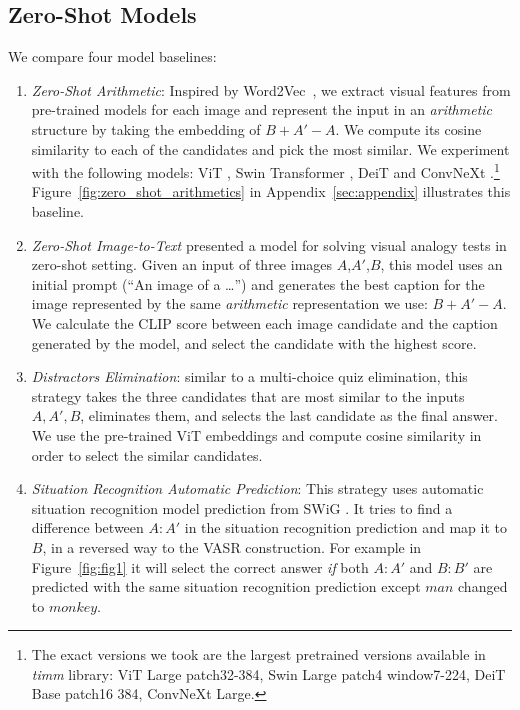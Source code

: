 \documentclass[letterpaper]{article} \usepackage{aaai23}  \usepackage{times}  \usepackage{helvet}  \usepackage{courier}  \usepackage[hyphens]{url}  \usepackage{graphicx} \urlstyle{rm} \def\UrlFont{\rm}  \usepackage{natbib}  \usepackage{caption} \frenchspacing  \setlength{\pdfpagewidth}{8.5in}  \setlength{\pdfpageheight}{11in}  \usepackage{algorithm}
\newcommand{\zeroshot}[0]{\emph{Zero-Shot Arithmetic}}
\begin{document}
\subsection{Zero-Shot Models} 
We compare four model baselines:
\begin{enumerate}
    \item \zeroshot{}: Inspired by Word2Vec~\cite{mikolov2013linguistic}, we extract visual features from pre-trained models for each image and represent the input in an \emph{arithmetic} structure by taking the embedding of $B+A'-A$. We compute its cosine similarity to each of the candidates and pick the most similar. We experiment with the following models: ViT \cite{dosovitskiy2020image}, Swin Transformer \cite{liu2021swin}, DeiT \cite{touvron2021training} and ConvNeXt \cite{liu2022convnet}.\footnote{The exact versions we took are the largest pretrained versions available in \emph{timm} library: ViT Large patch32-384, Swin Large patch4 window7-224, DeiT Base patch16 384, ConvNeXt Large.} Figure~\ref{fig:zero_shot_arithmetics} in Appendix~\ref{sec:appendix} illustrates this baseline.
    \item \emph{Zero-Shot Image-to-Text} \cite{tewel2021zero}  presented a model  for  solving visual analogy tests in zero-shot setting. Given an input of three images $A$,$A'$,$B$, this model uses an initial prompt (``An image of a \dots'') and generates the best caption for the image represented by the same \emph{arithmetic} representation we use: $B+A'-A$. We calculate the  CLIP score between each image candidate and the caption generated by the model, and select the candidate with the highest score.
    \item \emph{Distractors Elimination}: similar to a multi-choice quiz elimination, this strategy takes the three candidates that are most similar to the inputs $A, A', B$, eliminates them, and selects the last candidate as the final answer. We use the pre-trained ViT embeddings and compute cosine similarity in order to select the similar candidates. 
    \item \emph{Situation Recognition Automatic Prediction}: This strategy uses automatic situation recognition model prediction from SWiG \cite{pratt2020grounded}. It tries to find a difference between $A:A'$ in the situation recognition prediction and map it to $B$, in a reversed way to the VASR construction. For example in Figure~\ref{fig:fig1} it will select the correct answer \emph{if} both $A:A'$ and $B:B'$ are predicted with the same situation recognition prediction except $man$ changed to $monkey$.
\end{enumerate}
\end{document}
